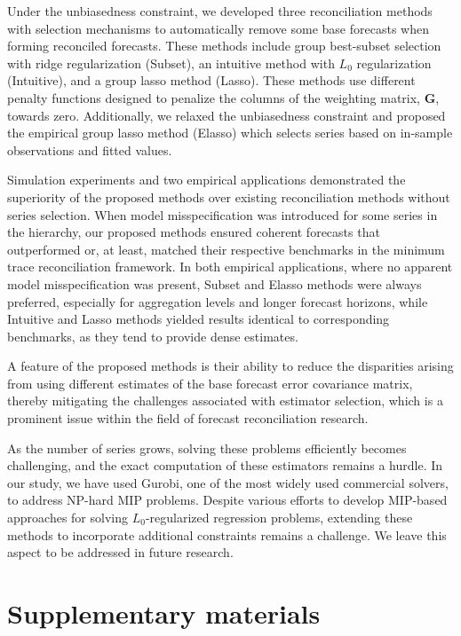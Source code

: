 \documentclass[
  11pt]{article}
\begin{document}
Under the unbiasedness constraint, we developed three reconciliation
methods with selection mechanisms to automatically remove some base
forecasts when forming reconciled forecasts. These methods include group
best-subset selection with ridge regularization (Subset), an intuitive
method with \(L_0\) regularization (Intuitive), and a group lasso method
(Lasso). These methods use different penalty functions designed to
penalize the columns of the weighting matrix, \(\bm{G}\), towards zero.
Additionally, we relaxed the unbiasedness constraint and proposed the
empirical group lasso method (Elasso) which selects series based on
in-sample observations and fitted values.

Simulation experiments and two empirical applications demonstrated the
superiority of the proposed methods over existing reconciliation methods
without series selection. When model misspecification was introduced for
some series in the hierarchy, our proposed methods ensured coherent
forecasts that outperformed or, at least, matched their respective
benchmarks in the minimum trace reconciliation framework. In both
empirical applications, where no apparent model misspecification was
present, Subset and Elasso methods were always preferred, especially for
aggregation levels and longer forecast horizons, while Intuitive and
Lasso methods yielded results identical to corresponding benchmarks, as
they tend to provide dense estimates.

A feature of the proposed methods is their ability to reduce the
disparities arising from using different estimates of the base forecast
error covariance matrix, thereby mitigating the challenges associated
with estimator selection, which is a prominent issue within the field of
forecast reconciliation research.

As the number of series grows, solving these problems efficiently
becomes challenging, and the exact computation of these estimators
remains a hurdle. In our study, we have used Gurobi, one of the most
widely used commercial solvers, to address NP-hard MIP problems. Despite
various efforts to develop MIP-based approaches for solving
\(L_0\)-regularized regression problems, extending these methods to
incorporate additional constraints remains a challenge. We leave this
aspect to be addressed in future research.

\hypertarget{supplementary-materials}{%
\section*{Supplementary materials}\label{supplementary-materials}}
\end{document}
